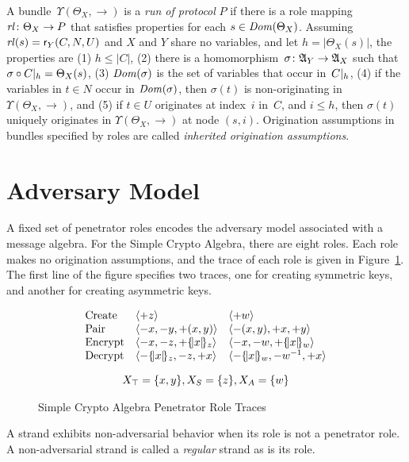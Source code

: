 \documentclass[12pt]{article}
\theoremstyle{definition}
\newcommand{\alga}{\alg{A}}
\newcommand{\sdom}{\fn{Dom}}
\newcommand{\role}{\mathsf{r}}
\newcommand{\rl}{\fn{rl}}
\begin{document}
A bundle~$\Upsilon(\Theta_X,\to)$ is a \emph{run of protocol} $P$ if
there is a role mapping $\rl\colon\Theta_X\to P$ that satisfies
properties for each $s\in\sdom(\Theta_X)$.  Assuming
$\rl(s)=\role_Y(C,N,U)$ and $X$ and $Y$ share no variables, and let
$h=|\Theta_X(s)|$, the properties are (1) $h\leq|C|$, (2) there is a
homomorphism~$\sigma\colon\alga_Y\to\alga_X$ such that
${\mathord{\sigma}}\circ{\mathord{C|_{h}}}=\Theta_X(s)$, (3) $\sdom(\sigma)$ is the
set of variables that occur in~$C|_{h}$, (4) if the variables
in $t\in N$ occur in $\sdom(\sigma)$, then $\sigma(t)$ is
non-originating in $\Upsilon(\Theta_X,\to)$, and (5) if $t\in U$
originates at index~$i$ in~$C$, and $i\leq h$, then $\sigma(t)$
uniquely originates in $\Upsilon(\Theta_X,\to)$ at node $(s,i)$.
Origination assumptions in bundles specified by roles are called
\emph{inherited origination assumptions}.

\section{Adversary Model}\label{sec:adversary model}

A fixed set of penetrator roles encodes the adversary model associated
with a message algebra.  For the Simple Crypto Algebra, there are eight
roles.  Each role makes no origination assumptions, and the trace of
each role is given in Figure~\ref{fig:pen}.  The first line of the
figure specifies two traces, one for creating symmetric keys, and
another for creating asymmetric keys.

\begin{figure}
$$\begin{array}{lll}
\mbox{Create}&
\seq{\outbnd z}&\seq{\outbnd w}\\
\mbox{Pair}&
\seq{\inbnd x,\inbnd y,\outbnd(x, y)}&
\seq{\inbnd(x, y),\outbnd x,\outbnd y}\\
\mbox{Encrypt}&
\seq{\inbnd x,\inbnd z,\outbnd\enc{x}{z}}&
\seq{\inbnd x,\inbnd w,\outbnd\enc{x}{w}}\\
\mbox{Decrypt}&
\seq{\inbnd\enc{x}{z},\inbnd z,\outbnd x}&
\seq{\inbnd\enc{x}{w},\inbnd w^{-1},\outbnd x}\\[1em]
\multicolumn{3}{c}{X_\top=\{x,y\}, X_S=\{z\}, X_A=\{w\}}
\end{array}$$
\caption{Simple Crypto Algebra Penetrator Role Traces}\label{fig:pen}
\end{figure}

A strand exhibits non-adversarial behavior when its role is not a
penetrator role.  A non-adversarial strand is called a \emph{regular}
strand as is its role.
\end{document}
